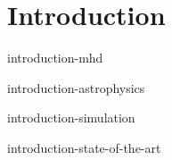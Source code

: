 \chapter{Introduction}

 {introduction-mhd}

 {introduction-astrophysics}

 {introduction-simulation}

 {introduction-state-of-the-art}